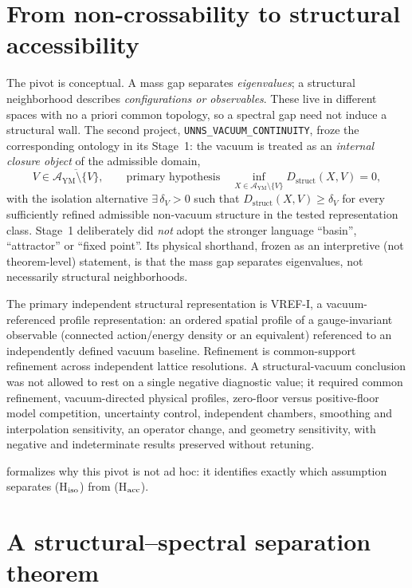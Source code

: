 \documentclass[11pt,a4paper]{article}
\theoremstyle{definition}
\theoremstyle{remark}
\newcommand{\Dstruct}{D_{\mathrm{struct}}}
\newcommand{\AYM}{\mathcal{A}_{\mathrm{YM}}}
\begin{document}
\section{From non-crossability to structural accessibility}\label{sec:pivot}

The pivot is conceptual. A mass gap separates \emph{eigenvalues}; a structural neighborhood describes \emph{configurations or observables}. These live in different spaces with no a priori common topology, so a spectral gap need not induce a structural wall. The second project, \texttt{UNNS\_VACUUM\_CONTINUITY}, froze the corresponding ontology in its Stage~1: the vacuum is treated as an \emph{internal closure object} of the admissible domain,
\begin{equation}
V\in\overline{\AYM\setminus\{V\}},\qquad\text{primary hypothesis}\quad \inf_{X\in\AYM\setminus\{V\}}\Dstruct(X,V)=0,
\end{equation}
with the isolation alternative $\exists\,\delta_V>0$ such that $\Dstruct(X,V)\ge\delta_V$ for every sufficiently refined admissible non-vacuum structure in the tested representation class. Stage~1 deliberately did \emph{not} adopt the stronger language ``basin'', ``attractor'' or ``fixed point''. Its physical shorthand, frozen as an interpretive (not theorem-level) statement, is that the mass gap separates eigenvalues, not necessarily structural neighborhoods.

The primary independent structural representation is VREF-I, a vacuum-referenced profile representation: an ordered spatial profile of a gauge-invariant observable (connected action/energy density or an equivalent) referenced to an independently defined vacuum baseline. Refinement is common-support refinement across independent lattice resolutions. A structural-vacuum conclusion was not allowed to rest on a single negative diagnostic value; it required common refinement, vacuum-directed physical profiles, zero-floor versus positive-floor model competition, uncertainty control, independent chambers, smoothing and interpolation sensitivity, an operator change, and geometry sensitivity, with negative and indeterminate results preserved without retuning.

 formalizes why this pivot is not ad hoc: it identifies exactly which assumption separates (H$_{\rm iso}$) from (H$_{\rm acc}$).

\section{A structural--spectral separation theorem}\label{sec:theorem}
\end{document}

